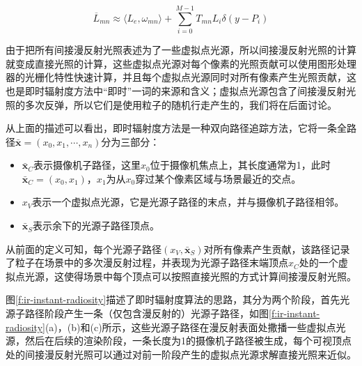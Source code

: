 \begin{equation}
		\overline{L}_{mn}\approx \langle L_e,\omega_{mn}\rangle +\sum^{M-1}_{i=0} T_{mn}L_i\delta(y-P_i)
\end{equation}

由于把所有间接漫反射光照表述为了一些虚拟点光源，所以间接漫反射光照的计算就变成直接光照的计算，这些虚拟点光源对每个像素的光照贡献可以使用图形处理器的光栅化特性快速计算，并且每个虚拟点光源同时对所有像素产生光照贡献，这也是即时辐射度方法中“即时”一词的来源和含义；虚拟点光源包含了间接漫反射光照的多次反弹，所以它们是使用粒子的随机行走产生的，我们将在后面讨论。

从上面的描述可以看出，即时辐射度方法是一种双向路径追踪方法，它将一条全路径$\bar{\mathbf{x}}=(x_0,x_1,\cdots,x_n)$分为三部分：

\begin{itemize}
	\item $\bar{\mathbf{x}}_C$表示摄像机子路径，这里$x_0$位于摄像机焦点上，其长度通常为1，此时$\bar{\mathbf{x}}_C=(x_0,x_1)$，$x_1$为从$x_0$穿过某个像素区域与场景最近的交点。
	\item $x_V$表示一个虚拟点光源，它是光源子路径的末点，并与摄像机子路径相邻。
	\item $\bar{\mathbf{x}}_S$表示余下的光源子路径顶点。
\end{itemize}

从前面的定义可知，每个光源子路径$(x_V,\bar{\mathbf{x}}_S)$对所有像素产生贡献，该路径记录了粒子在场景中的多次漫反射过程，并表现为光源子路径末端顶点$x_C$处的一个虚拟点光源，这使得场景中每个顶点可以按照直接光照的方式计算间接漫反射光照。

图\ref{f:ir-instant-radiosity}描述了即时辐射度算法的思路，其分为两个阶段，首先光源子路径阶段产生一条（仅包含漫反射的）光源子路径，如图\ref{f:ir-instant-radiosity}(a)，(b)和(c)所示，这些光源子路径在漫反射表面处撒播一些虚拟点光源，然后在后续的渲染阶段，一条长度为1的摄像机子路径被生成，每个可视顶点处的间接漫反射光照可以通过对前一阶段产生的虚拟点光源求解直接光照来近似。

